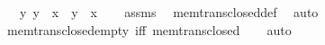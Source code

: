 \begin{isabellebody}
\ \ \ {\isachardoublequoteopen}{\isasymAnd}y{\isachardot}{\kern0pt}\ y\ {\isasymin}\ x\ {\isasymLongrightarrow}\ y\ {\isasymsubseteq}\ x{\isachardoublequoteclose}\isanewline
%
\isadelimproof
\ \ %
\endisadelimproof
%
\isatagproof
{}\isamarkupfalse%
\ assms\ \isamarkupfalse%
\ mem{\isacharunderscore}{\kern0pt}trans{\isacharunderscore}{\kern0pt}closed{\isacharunderscore}{\kern0pt}def\ \isamarkupfalse%
\ auto%
\endisatagproof
{\isafoldproof}%
%
\isadelimproof
\isanewline
%
\endisadelimproof
\isanewline
{}\isamarkupfalse%
\ mem{\isacharunderscore}{\kern0pt}trans{\isacharunderscore}{\kern0pt}closed{\isacharunderscore}{\kern0pt}empty\ {\isacharbrackleft}{\kern0pt}iff{\isacharbrackright}{\kern0pt}{\isacharcolon}{\kern0pt}\ {\isachardoublequoteopen}mem{\isacharunderscore}{\kern0pt}trans{\isacharunderscore}{\kern0pt}closed\ {\isacharbraceleft}{\kern0pt}{\isacharbraceright}{\kern0pt}{\isachardoublequoteclose}%
\isadelimproof
\ %
\endisadelimproof
%
\isatagproof
{}\isamarkupfalse%
\ auto%
\endisatagproof
{\isafoldproof}%
%
\isadelimproof
%
\endisadelimproof
\isanewline
\isanewline
%
\isadelimtheory
\isanewline
%
\endisadelimtheory
%
\isatagtheory
{}\isamarkupfalse%
%
\endisatagtheory
{\isafoldtheory}%
%
\isadelimtheory
%
\endisadelimtheory
%
\end{isabellebody}%
\endinput
